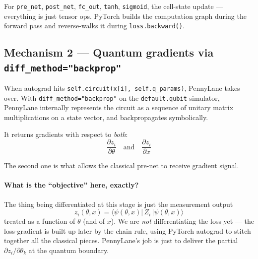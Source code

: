 \documentclass[11pt,a4paper]{article}
\begin{document}
For \texttt{pre\_net}, \texttt{post\_net}, \texttt{fc\_out}, \texttt{tanh}, \texttt{sigmoid}, the cell-state update --- everything is just tensor ops. PyTorch builds the computation graph during the forward pass and reverse-walks it during \texttt{loss.backward()}.

\subsection{Mechanism 2 --- Quantum gradients via \texttt{diff\_method="backprop"}}

When autograd hits \texttt{self.circuit(x[i], self.q\_params)}, PennyLane takes over. With \texttt{diff\_method="backprop"} on the \texttt{default.qubit} simulator, PennyLane internally represents the circuit as a sequence of unitary matrix multiplications on a state vector, and backpropagates symbolically.

It returns gradients with respect to \emph{both}:
\[
  \frac{\partial z_i}{\partial \theta} \quad\text{and}\quad \frac{\partial z_i}{\partial x}
\]

The second one is what allows the classical pre-net to receive gradient signal.

\paragraph{What is the ``objective'' here, exactly?} The thing being differentiated at this stage is just the measurement output
\[
  z_i(\theta, x) = \langle\psi(\theta, x)|\, Z_i\, |\psi(\theta, x)\rangle
\]
treated as a function of $\theta$ (and of $x$). We are \emph{not} differentiating the loss yet --- the loss-gradient is built up later by the chain rule, using PyTorch autograd to stitch together all the classical pieces. PennyLane's job is just to deliver the partial $\partial z_i / \partial \theta_k$ at the quantum boundary.
\end{document}
